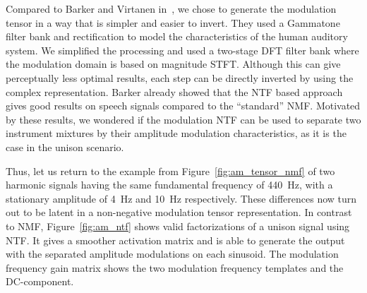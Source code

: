 %
%
\par
Compared to Barker and Virtanen in~\cite{barker13}, we chose to generate the modulation tensor in a way that is simpler and easier to invert. 
They used a Gammatone filter bank and rectification to model the characteristics of the human auditory system. 
We simplified the processing and used a two-stage DFT filter bank where the modulation domain is based on magnitude STFT. 
Although this can give perceptually less optimal results, each step can be directly inverted by using the complex representation.
Barker already showed that the NTF based approach gives good results on speech signals compared to the ``standard'' NMF. 
Motivated by these results, we wondered if the modulation NTF can be used to separate two instrument mixtures by their amplitude modulation characteristics, as it is the case in the unison scenario.
\par
Thus, let us return to the example from Figure~\ref{fig:am_tensor_nmf} of two harmonic signals having the same fundamental frequency of 440~\si{\hertz}, with a stationary amplitude of 4~\si{\hertz} and 10~\si{\hertz} respectively. 
These differences now turn out to be latent in a non-negative modulation tensor representation.
In contrast to NMF, Figure~\ref{fig:am_ntf} shows valid factorizations of a unison signal using NTF.
It gives a smoother activation matrix and is able to generate the output with the separated amplitude modulations on each sinusoid. The modulation frequency gain matrix shows the two modulation frequency templates and the DC-component.

